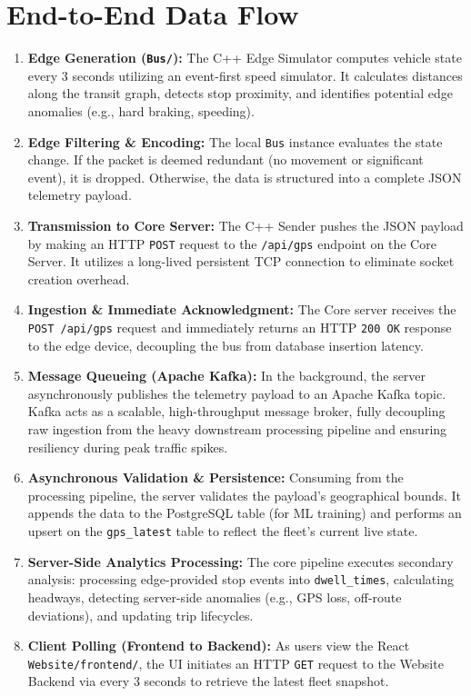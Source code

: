 \documentclass[a4paper]{article}
\begin{document}
\section{End-to-End Data Flow}
\begin{enumerate}
    \item \textbf{Edge Generation (\texttt{Bus/}):} The C++ Edge Simulator computes vehicle state every 3 seconds utilizing an event-first speed simulator. It calculates distances along the transit graph, detects stop proximity, and identifies potential edge anomalies (e.g., hard braking, speeding).
    \item \textbf{Edge Filtering \& Encoding:} The local \texttt{Bus} instance evaluates the state change. If the packet is deemed redundant (no movement or significant event), it is dropped. Otherwise, the data is structured into a complete JSON telemetry payload.
    \item \textbf{Transmission to Core Server:} The C++ Sender pushes the JSON payload by making an HTTP \texttt{POST} request to the \texttt{/api/gps} endpoint on the Core Server. It utilizes a long-lived persistent TCP connection to eliminate socket creation overhead.
    \item \textbf{Ingestion \& Immediate Acknowledgment:} The Core server receives the \texttt{POST /api/gps} request and immediately returns an HTTP \texttt{200 OK} response to the edge device, decoupling the bus from database insertion latency.
    \item \textbf{Message Queueing (Apache Kafka):} In the background, the server asynchronously publishes the telemetry payload to an Apache Kafka topic. Kafka acts as a scalable, high-throughput message broker, fully decoupling raw ingestion from the heavy downstream processing pipeline and ensuring resiliency during peak traffic spikes.
    \item \textbf{Asynchronous Validation \& Persistence:} Consuming from the processing pipeline, the server validates the payload's geographical bounds. It appends the data to the  PostgreSQL table (for ML training) and performs an upsert on the \texttt{gps\_latest} table to reflect the fleet's current live state.
    \item \textbf{Server-Side Analytics Processing:} The core pipeline executes secondary analysis: processing edge-provided stop events into \texttt{dwell\_times}, calculating headways, detecting server-side anomalies (e.g., GPS loss, off-route deviations), and updating trip lifecycles.
    \item \textbf{Client Polling (Frontend to Backend):} As users view the React \texttt{Website/frontend/}, the UI initiates an HTTP \texttt{GET} request to the Website Backend via  every 3 seconds to retrieve the latest fleet snapshot.

\end{enumerate}
\end{document}
